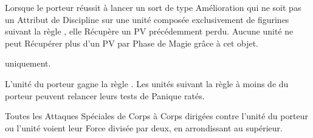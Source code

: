 \endpricelist

\armyarcaneitems

\startpricelist

Lorsque le porteur réussit à lancer un sort de type Amélioration qui ne soit pas un Attribut de Discipline sur une unité composée exclusivement de figurines suivant la règle \shacklesoffire{}, elle Récupère un PV précédemment perdu. Aucune unité ne peut Récupérer plus d'un PV par Phase de Magie grâce à cet objet.

\endpricelist

\armymagicalbanners

\startpricelist

\infantry{} uniquement.

L'unité du porteur gagne la règle \vanguard{}. Les unités suivant la règle \unruly{} à moins de  du porteur peuvent relancer leurs tests de Panique ratés. %

Toutes les Attaques Spéciales de Corps à Corps dirigées contre l'unité du porteur ou l'unité voient leur Force divisée par deux, en arrondissant au supérieur.

\endpricelist

\closearmymagicalitems




